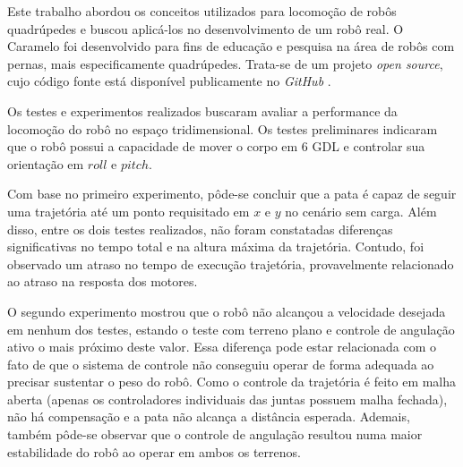 \documentclass[../main.tex]{subfiles}
\begin{document}
  Este trabalho abordou os conceitos utilizados para locomoção de robôs quadrúpedes e buscou aplicá-los no desenvolvimento de um robô real. O Caramelo foi desenvolvido para fins de educação e pesquisa na área de robôs com pernas, mais especificamente quadrúpedes. Trata-se de um projeto \textit{open source}, cujo código fonte está disponível publicamente no \textit{GitHub} \cite{CaramelRepo}. 
  
  Os testes e experimentos realizados buscaram avaliar a performance da locomoção do robô no espaço tridimensional. Os testes preliminares indicaram que o robô possui a capacidade de mover o corpo em 6 GDL e controlar sua orientação em $roll$ e $pitch$. 
  
  Com base no primeiro experimento, pôde-se concluir que a pata é capaz de seguir uma trajetória até um ponto requisitado em $x$ e $y$ no cenário sem carga. Além disso, entre os dois testes realizados, não foram constatadas diferenças significativas no tempo total e na altura máxima da trajetória. Contudo, foi observado um atraso no tempo de execução trajetória, provavelmente relacionado ao atraso na resposta dos motores.
   
  O segundo experimento mostrou que o robô não alcançou a velocidade desejada em nenhum dos testes, estando o teste com terreno plano e controle de angulação ativo o mais próximo deste valor. Essa diferença pode estar relacionada com o fato de que o sistema de controle não conseguiu operar de forma adequada ao precisar sustentar o peso do robô. Como o controle da trajetória é feito em malha aberta (apenas os controladores individuais das juntas possuem malha fechada), não há compensação e a pata não alcança a distância esperada. Ademais, também pôde-se observar que o controle de angulação resultou numa maior estabilidade do robô ao operar em ambos os terrenos.
  
\end{document}
